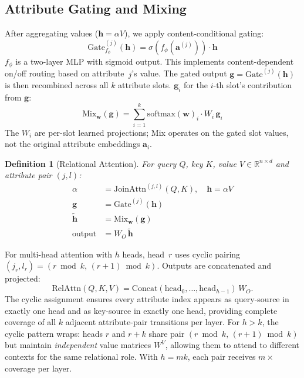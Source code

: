 \documentclass[review]{elsarticle}
\newtheorem{definition}{Definition}
\newcommand{\R}{\mathbb{R}}
\newcommand{\softmax}{\mathrm{softmax}}
\begin{document}
\subsection{Attribute Gating and Mixing}

After aggregating values ($\mathbf{h} = \alpha V$), we apply content-conditional gating:
\begin{equation}
\text{Gate}_{f_\phi}^{(j)}(\mathbf{h}) = \sigma(f_\phi(\mathbf{a}^{(j)})) \cdot \mathbf{h}
\end{equation}
$f_\phi$ is a two-layer MLP with sigmoid output. This implements content-dependent on/off routing based on attribute~$j$'s value. The gated output $\mathbf{g} = \text{Gate}^{(j)}(\mathbf{h})$ is then recombined across all $k$ attribute slots. $\mathbf{g}_i$ for the $i$-th slot's contribution from $\mathbf{g}$:
\begin{equation}
\text{Mix}_{\mathbf{w}}(\mathbf{g}) = \sum_{i=1}^{k} \softmax(\mathbf{w})_i \cdot W_i\, \mathbf{g}_i
\end{equation}
The $W_i$ are per-slot learned projections; Mix operates on the gated slot values, not the original attribute embeddings $\mathbf{a}_i$.

\begin{definition}[Relational Attention]
For query $Q$, key $K$, value $V \in \R^{n \times d}$ and attribute pair $(j,l)$:
\begin{align}
\alpha &= \text{JoinAttn}^{(j,l)}(Q, K),\quad \mathbf{h} = \alpha V \tag{value aggregation}\\
\mathbf{g} &= \text{Gate}^{(j)}(\mathbf{h}) \tag{slot gating} \\
\tilde{\mathbf{h}} &= \text{Mix}_{\mathbf{w}}(\mathbf{g}) \tag{slot mixing} \\
\text{output} &= W_O\,\tilde{\mathbf{h}} \tag{projection}
\end{align}
\end{definition}

For multi-head attention with $h$ heads, head~$r$ uses cyclic pairing $(j_r, l_r) = (r \bmod k,\,(r{+}1) \bmod k)$. Outputs are concatenated and projected:
\begin{equation}
\mathrm{RelAttn}(Q,K,V) = \mathrm{Concat}(\mathrm{head}_0, \ldots, \mathrm{head}_{h-1})\,W_O.
\end{equation}
The cyclic assignment ensures every attribute index appears as query-source in exactly one head and as key-source in exactly one head, providing complete coverage of all $k$ adjacent attribute-pair transitions per layer. For $h{>}k$, the cyclic pattern wraps: heads $r$ and $r{+}k$ share pair $(r \bmod k,\,(r{+}1) \bmod k)$ but maintain \emph{independent} value matrices $W^V$, allowing them to attend to different contexts for the same relational role. With $h{=}mk$, each pair receives $m{\times}$ coverage per layer.
\end{document}
